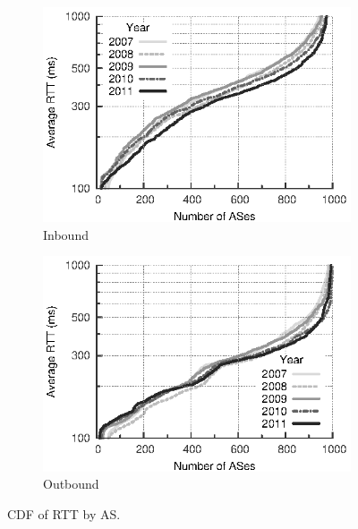 \begin{figure}
    \centering
    \begin{subfigure}[b]{0.5\linewidth}
        \includegraphics{figures/malawi/rtt_cdf_in}
        \caption{Inbound}
    \end{subfigure}%
    \begin{subfigure}[b]{0.5\linewidth}
        \includegraphics{figures/malawi/rtt_cdf_out}
        \caption{Outbound}
    \end{subfigure}%
    \caption{CDF of RTT by AS. \label{fig:rtt_cdf}}
\end{figure}

